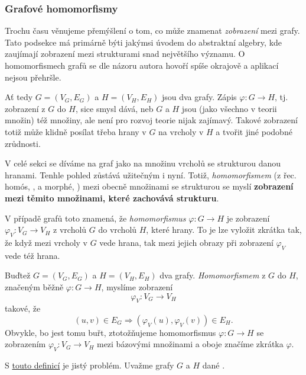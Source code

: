\subsubsection{Grafové homomorfismy}
\label{sssec:grafove-homomorfismy}

Trochu času věnujeme přemýšlení o tom, co může znamenat \emph{zobrazení} mezi
grafy. Tato podsekce má primárně býti jakýmsi úvodem do abstraktní algebry, kde
zaujímají zobrazení mezi strukturami snad největšího významu. O homomorfismech
grafů se dle názoru autora hovoří spíše okrajově a aplikací nejsou přehršle.

Ať tedy $G = (V_G,E_G)$ a $H = (V_H,E_H)$ jsou dva grafy. Zápis
$\varphi:G \to H$, tj. zobrazení z $G$ do $H$, sice smysl dává, neb $G$ a $H$
jsou (jako všechno v teorii množin) též množiny, ale není pro rozvoj teorie
nijak zajímavý. Takové zobrazení totiž může klidně posílat třeba hrany v $G$ na
vrcholy v $H$ a tvořit jiné podobné zrůdnosti.

V celé sekci se díváme na graf jako na množinu vrcholů se strukturou danou
hranami. Tenhle pohled zůstává užitečným i nyní. Totiž, \emph{homomorfismem} (z
řec. homós, , a morphé, ) mezi obecně množinami se
strukturou se myslí \textbf{zobrazení mezi těmito množinami, které zachovává
strukturu}.

V případě grafů toto znamená, že \emph{homomorfismus} $\varphi:G \to H$ je
zobrazení $\varphi_V:V_G \to V_H$ z vrcholů $G$ do vrcholů $H$, které
 hrany. To je lze vyložit zkrátka tak, že když mezi vrcholy v $G$
vede hrana, tak mezi jejich obrazy při zobrazení $\varphi_V$ vede též hrana.

\begin{definition}
 \label{def:grafovy-homomorfismus}
 Buďtež $G = (V_G,E_G)$ a $H = (V_H,E_H)$ dva grafy. \emph{Homomorfismem} z $G$
 do $H$, značeným běžně $\varphi:G \to H$, myslíme zobrazení
 \[
  \varphi_V:V_G \to V_H
 \]
 takové, že
 \[
  (u,v) \in E_G \Rightarrow (\varphi_V(u),\varphi_V(v)) \in E_H.
 \]
 Obvykle, bo jest tomu buřt, ztotožňujeme homomorfismus $\varphi:G \to H$ se
 zobrazením $\varphi_V:V_G \to V_H$ mezi bázovými množinami a oboje značíme
 zkrátka $\varphi$.
\end{definition}

S \hyperref[def:grafovy-homomorfismus]{touto definicí} je jistý problém. Uvažme
grafy $G$ a $H$ dané .

